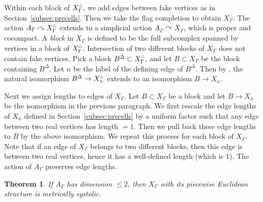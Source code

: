 \documentclass[11pt]{amsart}
\newtheorem{theorem}{Theorem}[section]
\theoremstyle{definition}
\newcommand{\Xb}{X^{\scalebox{0.53}{$\triangle$}}}
\newcommand{\lemsixtwo}{Lemma 6.3}
\newcommand{\lemsixseven}{Theorem 6.1}
\begin{document}
Within each block of $\Xb_\Gamma$, we add edges between fake vertices as in Section~\ref{subsec:precells}. Then we take the flag completion to obtain $X_\Gamma$. The action $A_{\Gamma}\curvearrowright\Xb_\Gamma$ extends to a simplicial action $A_{\Gamma}\curvearrowright X_{\Gamma}$, which is proper and cocompact. A \emph{block} in $X_{\Gamma}$ is defined to be the full subcomplex spanned by vertices in a block of $\Xb_\Gamma$. Intersection of two different blocks of $X_\Gamma$ does not contain fake vertices. Pick a block $B^{\Delta}\subset \Xb_\Gamma$, and let $B\subset X_\Gamma$ be the block containing $B^{\Delta}$. Let $n$ be the label of the defining edge of $B^{\Delta}$. Then by \cite[\lemsixtwo]{Artinmetric}, the natural isomorphism $B^{\Delta}\to \Xb_n$ extends to an isomorphism $B\to X_n$. 


Next we assign lengths to edges of $X_\Gamma$. Let $B\subset X_\Gamma$ be a block and let $B\to X_n$ be the isomorphism in the previous paragraph. We first rescale the edge lengths of $X_n$ defined in Section~\ref{subsec:precells} by a uniform factor such that any edge between two real vertices has length $=1$. Then we pull back these edge lengths to $B$ by the above isomorphism. We repeat this process for each block of $X_\Gamma$. Note that if an edge of $X_\Gamma$ belongs to two different blocks, then this edge is between two real vertices, hence it has a well-defined length (which is $1$). The action of $A_\Gamma$ preserves edge lengths.


\begin{theorem}\cite[\lemsixseven]{Artinmetric}
	\label{thm:msystolic}
If $A_\Gamma$ has dimension $\le 2$, then $X_\Gamma$ with its piecewise Euclidean structure is metrically systolic.
\end{theorem}
\end{document}
